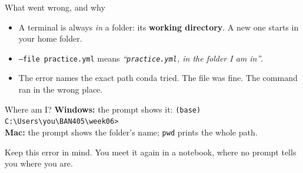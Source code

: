 \documentclass[aspectratio=169,11pt]{beamer}
\newcommand{\code}[1]{\texttt{#1}}
\newcommand{\key}[1]{\textbf{\textcolor{ban}{#1}}}
\begin{document}
\begin{frame}{What went wrong, and why}
  \begin{itemize}
    \item A terminal is always \emph{in} a folder: its \key{working directory}. A new one starts in your home folder.
    \item \code{--file practice.yml} means \emph{``\code{practice.yml}, in the folder I am in''}.
    \item The error names the exact path conda tried. The file was fine. The command ran in the wrong place.
  \end{itemize}
  \vspace{0.8em}
  \begin{block}{Where am I?}
    \textbf{Windows:} the prompt shows it: \code{(base) C:\textbackslash Users\textbackslash you\textbackslash BAN405\textbackslash week06>}\\
    \textbf{Mac:} the prompt shows the folder's name; \code{pwd} prints the whole path.
  \end{block}
  \vspace{0.4em}
  Keep this error in mind. You meet it again in a notebook, where no prompt tells you where you are.
\end{frame}
\end{document}
